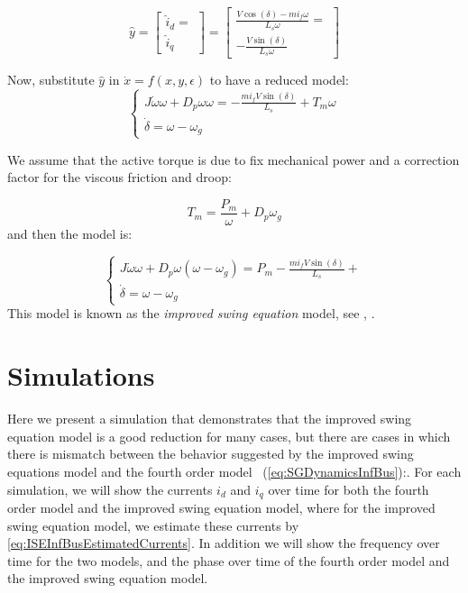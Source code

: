 \documentclass[conference]{IEEEtran}
\newcommand{\rfb}[1]{\mbox{\rm
   (\ref{#1})}\ifx\undefined\stillediting\else:\fbox{$#1$}\fi}
\begin{document}
\begin{equation}
\hat{y}=\left[\begin{array}{c}
\hat{i}_{d}=\\
\hat{i}_{q}
\end{array}\right]=\left[\begin{array}{c}
\frac{V\cos(\delta)-mi_{f}\omega}{L_{s}\omega}=\\
-\frac{V\sin(\delta)}{L_{s}\omega}
\end{array}\right]\label{eq:ISEInfBusEstimatedCurrents}
\end{equation}


Now, substitute $\hat{y}$ in $\dot{x}=f(x,y,\epsilon)$ to have a
reduced model:
\[
\left\{ \begin{array}{c}
J\dot{\omega}\omega+D_{p}\omega\omega=-\frac{mi_{f}V\sin(\delta)}{L_{s}}+T_{m}\omega\\
\dot{\delta}=\omega-\omega_{g}
\end{array}\right.
\]


We assume that the active torque is due to fix mechanical power and
a correction factor for the viscous friction and droop:

\[
T_{m}=\frac{P_{m}}{\omega}+D_{p}\omega_{g}
\]
and then the model is: 

\[
\left\{ \begin{array}{c}
J\dot{\omega}\omega+D_{p}\omega(\omega-\omega_{g})=P_{m}-\frac{mi_{f}V\sin(\delta)}{L_{s}}+\\
\dot{\delta}=\omega-\omega_{g}
\end{array}\right.
\]
This model is known as the {\em improved swing equation} model,
see \cite{DePersiSchaft:16}, \cite{ZhouOhsawa2009}.

\section{Simulations}

Here we present a simulation that demonstrates that the improved swing
equation model is a good reduction for many cases, but there are cases
in which there is mismatch between the behavior suggested by the
improved swing equations model and the fourth order model
\rfb{eq:SGDynamicsInfBus}. For each simulation, we will show the
currents $i_d$ and $i_q$ over time for both the fourth order model
and the improved swing equation model, where for the improved swing
equation model, we estimate these currents by
\eqref{eq:ISEInfBusEstimatedCurrents}.  In addition we will show the
frequency over time for the two models, and the phase over time of the
fourth order model and the improved swing equation model.
\end{document}
